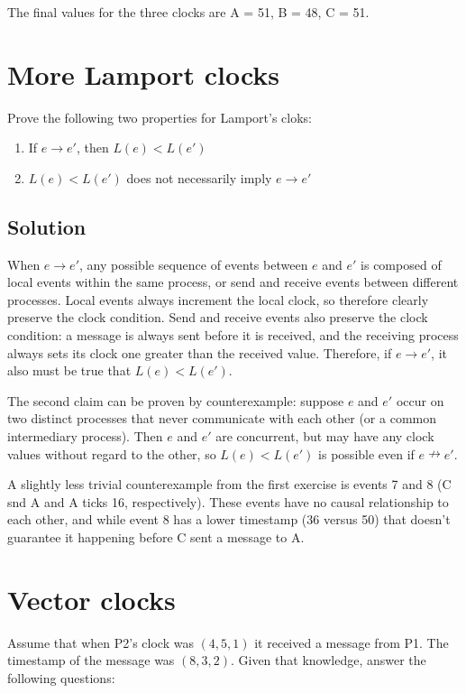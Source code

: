 \documentclass[12pt,a4paper,titlepage]{article}
\begin{document}
The final values for the three clocks are A = 51, B = 48, C = 51.

\section{More Lamport clocks}

Prove the following two properties for Lamport's cloks:\\
\begin{enumerate}
\item If $e \to e'$, then $L(e) < L(e')$\\
\item $L(e) < L(e')$ does not necessarily imply $e \to e'$
\end{enumerate}

\subsection{Solution}

When $e \to e'$, any possible sequence of events between $e$ and $e'$ is composed of local events within the same process, or send and receive events between different processes. Local events always increment the local clock, so therefore clearly preserve the clock condition. Send and receive events also preserve the clock condition: a message is always sent before it is received, and the receiving process always sets its clock one greater than the received value. Therefore, if $e \to e'$, it also must be true that $L(e) < L(e')$.

The second claim can be proven by counterexample: suppose $e$ and $e'$ occur on two distinct processes that never communicate with each other (or a common intermediary process). Then $e$ and $e'$ are concurrent, but may have any clock values without regard to the other, so $L(e) < L(e')$ is possible even if $e \nrightarrow e'$.

A slightly less trivial counterexample from the first exercise is events 7 and 8 (C snd A and A ticks 16, respectively). These events have no causal relationship to each other, and while event 8 has a lower timestamp (36 versus 50) that doesn't guarantee it happening before C sent a message to A.

\section{Vector clocks}

Assume that when P2's clock was $(4, 5, 1)$ it received a message from P1. The timestamp of the message was $(8, 3, 2)$. Given that knowledge, answer the following questions:
\end{document}
